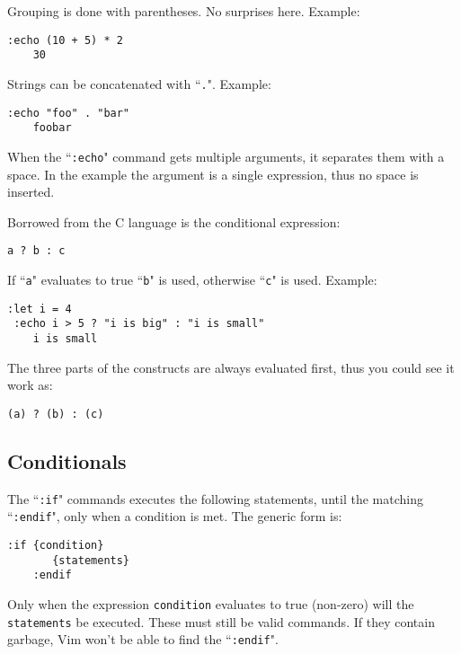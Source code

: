 Grouping is done with parentheses.
No surprises here.
Example:

\begin{Verbatim}[samepage=true]
 :echo (10 + 5) * 2
    30
\end{Verbatim}

Strings can be concatenated with ``\texttt{.}".
Example:

\begin{Verbatim}[samepage=true]
 :echo "foo" . "bar"
    foobar
\end{Verbatim}

When the ``\texttt{:echo}" command gets multiple arguments, it separates them with a space.
In the example the argument is a single expression, thus no space is inserted.

Borrowed from the C language is the conditional expression:

\begin{Verbatim}[samepage=true]
    a ? b : c
\end{Verbatim}

If ``\texttt{a}" evaluates to true ``\texttt{b}" is used, otherwise ``\texttt{c}" is used.
Example:

\begin{Verbatim}[samepage=true]
 :let i = 4
 :echo i > 5 ? "i is big" : "i is small"
    i is small
\end{Verbatim}

The three parts of the constructs are always evaluated first, thus you could see it work as:

\begin{Verbatim}[samepage=true]
    (a) ? (b) : (c)
\end{Verbatim}
\subsection{Conditionals}
The ``\texttt{:if}" commands executes the following statements, until the matching ``\texttt{:endif}", only when a condition is met.
The generic form is:

\begin{Verbatim}[samepage=true]
    :if {condition}
       {statements}
    :endif
\end{Verbatim}

Only when the expression \texttt{{condition}} evaluates to true (non-zero) will the \texttt{{statements}} be executed.
These must still be valid commands.
If they contain garbage, Vim won't be able to find the ``\texttt{:endif}".

